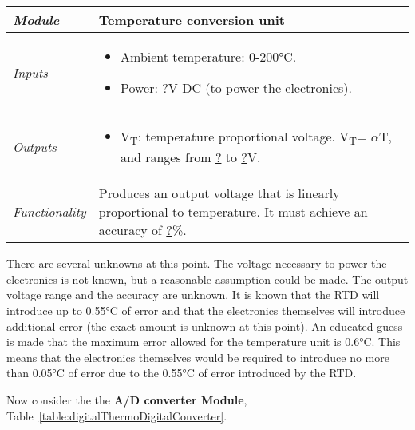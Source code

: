 \begin{table}[h]
\label{table:digitalThermoTempConvUnit}
\begin{tabular}{|l|m{10cm}|}
\hline
\emph{Module} & Temperature conversion unit\\ \hline
\emph{Inputs} & 
\begin{itemize}
\item  Ambient temperature: 0-200°C.
\item  Power: \ul{?}V DC (to power the electronics).
\end{itemize}  \\ \hline
\emph{Outputs} & 
\begin{itemize}
\item  V\textsubscript{T}: temperature proportional voltage.
  V\textsubscript{T}= \underline{$\alpha$}T, and ranges from \underline{?} to \underline{?}V.
\end{itemize}\\ \hline
\emph{Functionality} & Produces an output voltage that is linearly
proportional to temperature. It must achieve an accuracy of \underline{?}\%. \\ \hline
\end{tabular}
\end{table}

There are several unknowns at this point. The voltage necessary to power
the electronics is not known, but a reasonable assumption could be made.
The output voltage range and the accuracy are unknown. It is known that
the RTD will introduce up to 0.55°C of error and that the electronics
themselves will introduce additional error (the exact amount is unknown
at this point). An educated guess is made that the maximum error allowed
for the temperature unit is 0.6°C. This means that the electronics
themselves would be required to introduce no more than 0.05°C of error
due to the 0.55°C of error introduced by the RTD.

Now consider the 
the \textbf{A/D converter Module}, 
Table~\ref{table:digitalThermoDigitalConverter}.


